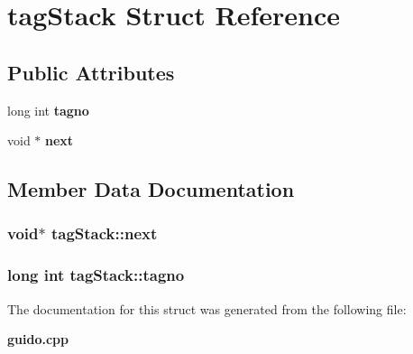 \section{tag\-Stack Struct Reference}
\label{structtagStack}
\subsection*{Public Attributes}
\begin{CompactItemize}
\item 
long int {\bf tagno}
\item 
void $\ast$ {\bf next}
\end{CompactItemize}


\subsection{Member Data Documentation}
\subsubsection{\setlength{\rightskip}{0pt plus 5cm}void$\ast$ {\bf tag\-Stack::next}}\label{structtagStack_o1}


\subsubsection{\setlength{\rightskip}{0pt plus 5cm}long int {\bf tag\-Stack::tagno}}\label{structtagStack_o0}




The documentation for this struct was generated from the following file:\begin{CompactItemize}
\item 
{\bf guido.cpp}\end{CompactItemize}
